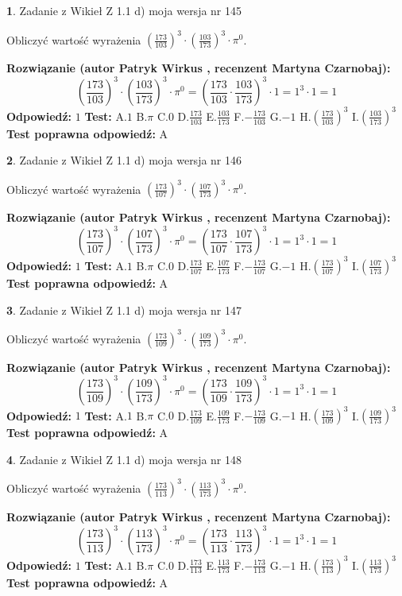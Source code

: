 \documentclass[12pt, a4paper]{article}
\theoremstyle{definition} %
\newtheorem{zad}{}
\newcommand{\zadStart}[1]{\begin{zad}#1\newline}
\newcommand{\zadStop}{\end{zad}}
\newcommand{\rozwStart}[2]{\noindent \textbf{Rozwiązanie (autor #1 , recenzent #2): }\newline}
\newcommand{\rozwStop}{\newline}
\newcommand{\odpStart}{\noindent \textbf{Odpowiedź:}\newline}
\newcommand{\odpStop}{\newline}
\newcommand{\testStart}{\noindent \textbf{Test:}\newline}
\newcommand{\testStop}{\newline}
\newcommand{\kluczStart}{\noindent \textbf{Test poprawna odpowiedź:}\newline}
\newcommand{\kluczStop}{\newline}
\begin{document}
\zadStart{Zadanie z Wikieł Z 1.1 d) moja wersja nr 145}

Obliczyć wartość wyrażenia $(\frac{173}{103})^{3} \cdot (\frac{103}{173})^{3} \cdot \pi^{0}$.
\zadStop
\rozwStart{Patryk Wirkus}{Martyna Czarnobaj}
$$(\frac{173}{103})^{3} \cdot (\frac{103}{173})^{3} \cdot \pi^{0} = (\frac{173}{103} \cdot \frac{103}{173})^{3} \cdot 1 = 1^{3} \cdot 1 = 1$$
\rozwStop
\odpStart
$1$
\odpStop
\testStart
A.$1$ B.$\pi$ C.$0$ D.$\frac{173}{103}$ E.$\frac{103}{173}$
F.$-\frac{173}{103}$ G.$-1$
H.$(\frac{173}{103})^{3}$
I.$(\frac{103}{173})^{3}$
\testStop
\kluczStart
A
\kluczStop



\zadStart{Zadanie z Wikieł Z 1.1 d) moja wersja nr 146}

Obliczyć wartość wyrażenia $(\frac{173}{107})^{3} \cdot (\frac{107}{173})^{3} \cdot \pi^{0}$.
\zadStop
\rozwStart{Patryk Wirkus}{Martyna Czarnobaj}
$$(\frac{173}{107})^{3} \cdot (\frac{107}{173})^{3} \cdot \pi^{0} = (\frac{173}{107} \cdot \frac{107}{173})^{3} \cdot 1 = 1^{3} \cdot 1 = 1$$
\rozwStop
\odpStart
$1$
\odpStop
\testStart
A.$1$ B.$\pi$ C.$0$ D.$\frac{173}{107}$ E.$\frac{107}{173}$
F.$-\frac{173}{107}$ G.$-1$
H.$(\frac{173}{107})^{3}$
I.$(\frac{107}{173})^{3}$
\testStop
\kluczStart
A
\kluczStop



\zadStart{Zadanie z Wikieł Z 1.1 d) moja wersja nr 147}

Obliczyć wartość wyrażenia $(\frac{173}{109})^{3} \cdot (\frac{109}{173})^{3} \cdot \pi^{0}$.
\zadStop
\rozwStart{Patryk Wirkus}{Martyna Czarnobaj}
$$(\frac{173}{109})^{3} \cdot (\frac{109}{173})^{3} \cdot \pi^{0} = (\frac{173}{109} \cdot \frac{109}{173})^{3} \cdot 1 = 1^{3} \cdot 1 = 1$$
\rozwStop
\odpStart
$1$
\odpStop
\testStart
A.$1$ B.$\pi$ C.$0$ D.$\frac{173}{109}$ E.$\frac{109}{173}$
F.$-\frac{173}{109}$ G.$-1$
H.$(\frac{173}{109})^{3}$
I.$(\frac{109}{173})^{3}$
\testStop
\kluczStart
A
\kluczStop



\zadStart{Zadanie z Wikieł Z 1.1 d) moja wersja nr 148}

Obliczyć wartość wyrażenia $(\frac{173}{113})^{3} \cdot (\frac{113}{173})^{3} \cdot \pi^{0}$.
\zadStop
\rozwStart{Patryk Wirkus}{Martyna Czarnobaj}
$$(\frac{173}{113})^{3} \cdot (\frac{113}{173})^{3} \cdot \pi^{0} = (\frac{173}{113} \cdot \frac{113}{173})^{3} \cdot 1 = 1^{3} \cdot 1 = 1$$
\rozwStop
\odpStart
$1$
\odpStop
\testStart
A.$1$ B.$\pi$ C.$0$ D.$\frac{173}{113}$ E.$\frac{113}{173}$
F.$-\frac{173}{113}$ G.$-1$
H.$(\frac{173}{113})^{3}$
I.$(\frac{113}{173})^{3}$
\testStop
\kluczStart
A
\kluczStop
\end{document}
